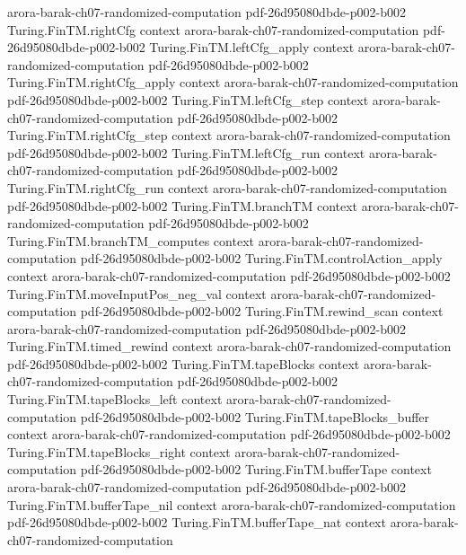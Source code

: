\begin{theorem}
  {arora-barak-ch07-randomized-computation}
  {pdf-26d95080dbde-p002-b002}
\proofstep
  {Turing.FinTM.rightCfg}
  {context}
  {arora-barak-ch07-randomized-computation}
  {pdf-26d95080dbde-p002-b002}
\proofstep
  {Turing.FinTM.leftCfg_apply}
  {context}
  {arora-barak-ch07-randomized-computation}
  {pdf-26d95080dbde-p002-b002}
\proofstep
  {Turing.FinTM.rightCfg_apply}
  {context}
  {arora-barak-ch07-randomized-computation}
  {pdf-26d95080dbde-p002-b002}
\proofstep
  {Turing.FinTM.leftCfg_step}
  {context}
  {arora-barak-ch07-randomized-computation}
  {pdf-26d95080dbde-p002-b002}
\proofstep
  {Turing.FinTM.rightCfg_step}
  {context}
  {arora-barak-ch07-randomized-computation}
  {pdf-26d95080dbde-p002-b002}
\proofstep
  {Turing.FinTM.leftCfg_run}
  {context}
  {arora-barak-ch07-randomized-computation}
  {pdf-26d95080dbde-p002-b002}
\proofstep
  {Turing.FinTM.rightCfg_run}
  {context}
  {arora-barak-ch07-randomized-computation}
  {pdf-26d95080dbde-p002-b002}
\proofstep
  {Turing.FinTM.branchTM}
  {context}
  {arora-barak-ch07-randomized-computation}
  {pdf-26d95080dbde-p002-b002}
\proofstep
  {Turing.FinTM.branchTM_computes}
  {context}
  {arora-barak-ch07-randomized-computation}
  {pdf-26d95080dbde-p002-b002}
\proofstep
  {Turing.FinTM.controlAction_apply}
  {context}
  {arora-barak-ch07-randomized-computation}
  {pdf-26d95080dbde-p002-b002}
\proofstep
  {Turing.FinTM.moveInputPos_neg_val}
  {context}
  {arora-barak-ch07-randomized-computation}
  {pdf-26d95080dbde-p002-b002}
\proofstep
  {Turing.FinTM.rewind_scan}
  {context}
  {arora-barak-ch07-randomized-computation}
  {pdf-26d95080dbde-p002-b002}
\proofstep
  {Turing.FinTM.timed_rewind}
  {context}
  {arora-barak-ch07-randomized-computation}
  {pdf-26d95080dbde-p002-b002}
\proofstep
  {Turing.FinTM.tapeBlocks}
  {context}
  {arora-barak-ch07-randomized-computation}
  {pdf-26d95080dbde-p002-b002}
\proofstep
  {Turing.FinTM.tapeBlocks_left}
  {context}
  {arora-barak-ch07-randomized-computation}
  {pdf-26d95080dbde-p002-b002}
\proofstep
  {Turing.FinTM.tapeBlocks_buffer}
  {context}
  {arora-barak-ch07-randomized-computation}
  {pdf-26d95080dbde-p002-b002}
\proofstep
  {Turing.FinTM.tapeBlocks_right}
  {context}
  {arora-barak-ch07-randomized-computation}
  {pdf-26d95080dbde-p002-b002}
\proofstep
  {Turing.FinTM.bufferTape}
  {context}
  {arora-barak-ch07-randomized-computation}
  {pdf-26d95080dbde-p002-b002}
\proofstep
  {Turing.FinTM.bufferTape_nil}
  {context}
  {arora-barak-ch07-randomized-computation}
  {pdf-26d95080dbde-p002-b002}
\proofstep
  {Turing.FinTM.bufferTape_nat}
  {context}
  {arora-barak-ch07-randomized-computation}

\end{theorem}
